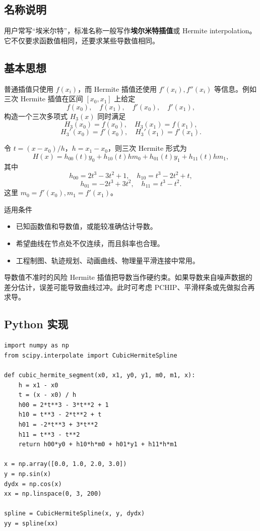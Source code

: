 \documentclass[11pt,a4paper]{ctexart}
\begin{document}
\subsection{名称说明}

用户常写“埃米尔特”，标准名称一般写作\textbf{埃尔米特插值}或 Hermite interpolation。它不仅要求函数值相同，还要求某些导数值相同。

\subsection{基本思想}

普通插值只使用 $f(x_i)$，而 Hermite 插值还使用 $f'(x_i),f''(x_i)$ 等信息。例如三次 Hermite 插值在区间 $[x_0,x_1]$ 上给定
\[
  f(x_0),\quad f(x_1),\quad f'(x_0),\quad f'(x_1),
\]
构造一个三次多项式 $H_3(x)$ 同时满足
\[
  H_3(x_0)=f(x_0),\quad H_3(x_1)=f(x_1),
\]
\[
  H_3'(x_0)=f'(x_0),\quad H_3'(x_1)=f'(x_1).
\]

令 $t=(x-x_0)/h$，$h=x_1-x_0$，则三次 Hermite 形式为
\[
H(x)=h_{00}(t)y_0+h_{10}(t)hm_0+h_{01}(t)y_1+h_{11}(t)hm_1,
\]
其中
\[
 h_{00}=2t^3-3t^2+1,
\quad h_{10}=t^3-2t^2+t,
\]
\[
 h_{01}=-2t^3+3t^2,
\quad h_{11}=t^3-t^2.
\]
这里 $m_0=f'(x_0),m_1=f'(x_1)$。

\begin{keybox}{适用条件}
\begin{itemize}
  \item 已知函数值和导数值，或能较准确估计导数。
  \item 希望曲线在节点处不仅连续，而且斜率也合理。
  \item 工程制图、轨迹规划、动画曲线、物理量平滑连接中常用。
\end{itemize}
\end{keybox}

\begin{warnbox}{导数值不准时的风险}
Hermite 插值把导数当作硬约束。如果导数来自噪声数据的差分估计，误差可能导致曲线过冲。此时可考虑 PCHIP、平滑样条或先做拟合再求导。
\end{warnbox}

\subsection{Python 实现}

\begin{lstlisting}
import numpy as np
from scipy.interpolate import CubicHermiteSpline

def cubic_hermite_segment(x0, x1, y0, y1, m0, m1, x):
    h = x1 - x0
    t = (x - x0) / h
    h00 = 2*t**3 - 3*t**2 + 1
    h10 = t**3 - 2*t**2 + t
    h01 = -2*t**3 + 3*t**2
    h11 = t**3 - t**2
    return h00*y0 + h10*h*m0 + h01*y1 + h11*h*m1

x = np.array([0.0, 1.0, 2.0, 3.0])
y = np.sin(x)
dydx = np.cos(x)
xx = np.linspace(0, 3, 200)

spline = CubicHermiteSpline(x, y, dydx)
yy = spline(xx)
\end{lstlisting}
\end{document}
